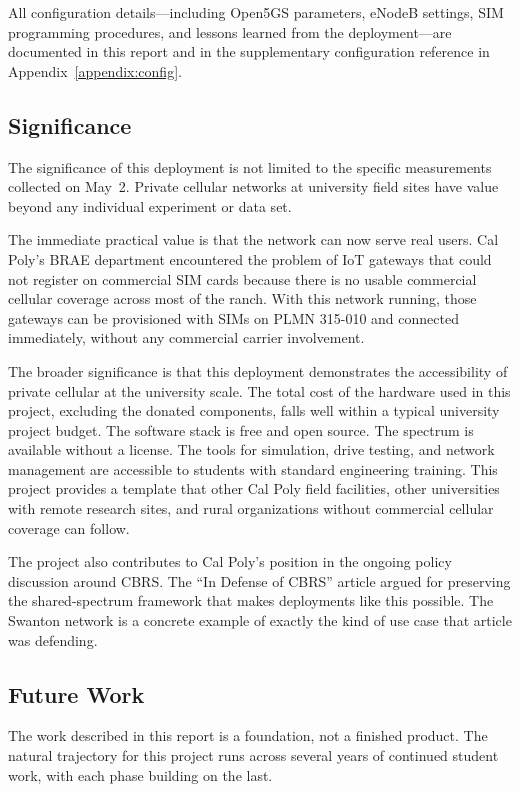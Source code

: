 \documentclass[
    left=1.5in,
    right=1.25in,
    top=1.25in,
    bottom=1.25in
]{CalPolySeniorProject}
\begin{document}
All configuration details---including Open5GS parameters, eNodeB settings, SIM
programming procedures, and lessons learned from the deployment---are documented
in this report and in the supplementary configuration reference in
Appendix~\ref{appendix:config}.

\subsection{Significance}

The significance of this deployment is not limited to the specific measurements
collected on May~2. Private cellular networks at university field sites have
value beyond any individual experiment or data set.

The immediate practical value is that the network can now serve real users. Cal
Poly's BRAE department encountered the problem of IoT gateways that could not
register on commercial SIM cards because there is no usable commercial cellular
coverage across most of the ranch. With this network running, those gateways can
be provisioned with SIMs on PLMN 315-010 and connected immediately, without any
commercial carrier involvement.

The broader significance is that this deployment demonstrates the accessibility
of private cellular at the university scale. The total cost of the hardware used
in this project, excluding the donated components, falls well within a typical
university project budget. The software stack is free and open source. The
spectrum is available without a license. The tools for simulation, drive testing,
and network management are accessible to students with standard engineering
training. This project provides a template that other Cal Poly field facilities,
other universities with remote research sites, and rural organizations without
commercial cellular coverage can follow.

The project also contributes to Cal Poly's position in the ongoing policy
discussion around CBRS. The ``In Defense of CBRS'' article
\autocite{lupo2026cbrs} argued for preserving the shared-spectrum framework that
makes deployments like this possible. The Swanton network is a concrete example
of exactly the kind of use case that article was defending.

\subsection{Future Work}

The work described in this report is a foundation, not a finished product. The
natural trajectory for this project runs across several years of continued
student work, with each phase building on the last.
\end{document}
